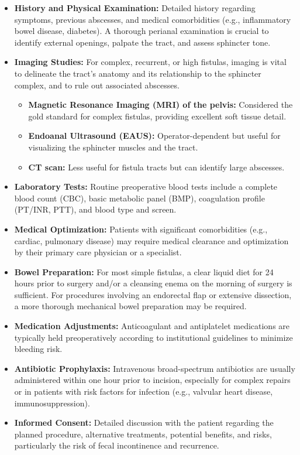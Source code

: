 \begin{itemize}
  \item \textbf{History and Physical Examination:} Detailed history regarding symptoms, previous abscesses, and medical comorbidities (e.g., inflammatory bowel disease, diabetes). A thorough perianal examination is crucial to identify external openings, palpate the tract, and assess sphincter tone.
  \item \textbf{Imaging Studies:} For complex, recurrent, or high fistulas, imaging is vital to delineate the tract's anatomy and its relationship to the sphincter complex, and to rule out associated abscesses.
    \begin{itemize}
      \item \textbf{Magnetic Resonance Imaging (MRI) of the pelvis:} Considered the gold standard for complex fistulas, providing excellent soft tissue detail.
      \item \textbf{Endoanal Ultrasound (EAUS):} Operator-dependent but useful for visualizing the sphincter muscles and the tract.
      \item \textbf{CT scan:} Less useful for fistula tracts but can identify large abscesses.
    \end{itemize}
  \item \textbf{Laboratory Tests:} Routine preoperative blood tests include a complete blood count (CBC), basic metabolic panel (BMP), coagulation profile (PT/INR, PTT), and blood type and screen.
  \item \textbf{Medical Optimization:} Patients with significant comorbidities (e.g., cardiac, pulmonary disease) may require medical clearance and optimization by their primary care physician or a specialist.
  \item \textbf{Bowel Preparation:} For most simple fistulas, a clear liquid diet for 24 hours prior to surgery and/or a cleansing enema on the morning of surgery is sufficient. For procedures involving an endorectal flap or extensive dissection, a more thorough mechanical bowel preparation may be required.
  \item \textbf{Medication Adjustments:} Anticoagulant and antiplatelet medications are typically held preoperatively according to institutional guidelines to minimize bleeding risk.
  \item \textbf{Antibiotic Prophylaxis:} Intravenous broad-spectrum antibiotics are usually administered within one hour prior to incision, especially for complex repairs or in patients with risk factors for infection (e.g., valvular heart disease, immunosuppression).
  \item \textbf{Informed Consent:} Detailed discussion with the patient regarding the planned procedure, alternative treatments, potential benefits, and risks, particularly the risk of fecal incontinence and recurrence.
\end{itemize}


